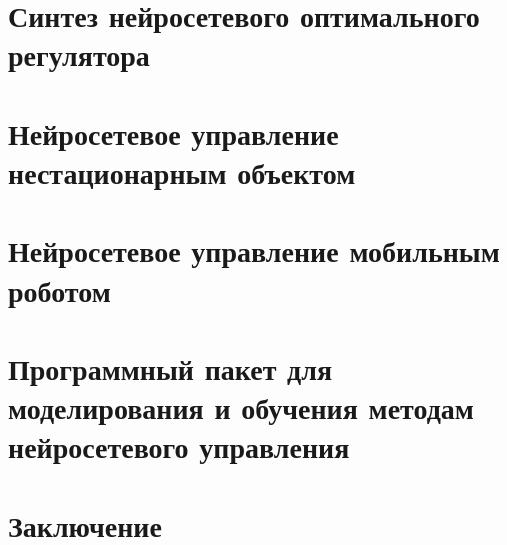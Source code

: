 \documentclass[12pt]{rusthesis}
\begin{document}
\chapter{Синтез нейросетевого оптимального регулятора}


\chapter{Нейросетевое управление нестационарным объектом}


\chapter{Нейросетевое управление мобильным роботом}


\chapter{Программный пакет для моделирования и обучения методам нейросетевого управления}


\chapter*{Заключение}




%

%
\end{document}
